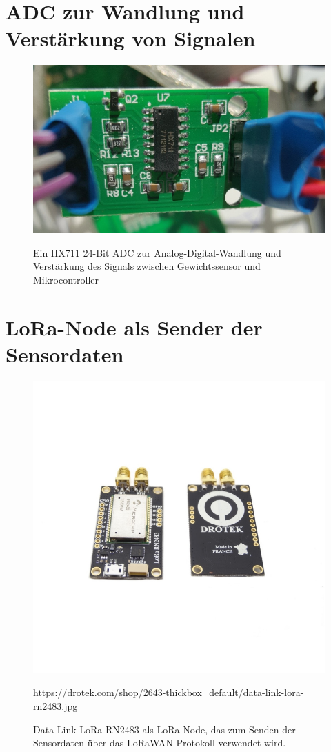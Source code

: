 \section{ADC zur Wandlung und Verstärkung von Signalen}
\begin{figure}[ht]
    \center
    \includegraphics[width=14cm]{Bilder/gewichtssensor.jpg}\\
    \caption{Ein HX711 24-Bit ADC zur Analog-Digital-Wandlung und Verstärkung des Signals zwischen Gewichtssensor und Mikrocontroller}
    \label{fig:Gewichtssensor}
\end{figure}
\newpage
\section{LoRa-Node als Sender der Sensordaten}
\begin{figure}[ht]
    \center
    \includegraphics[width=14cm]{Bilder/lora-node.jpg}\\
    \caption{Data Link LoRa RN2483 als LoRa-Node, das zum Senden der Sensordaten über das LoRaWAN-Protokoll verwendet wird.}
    \begin{flushleft}
        \quelle\url{https://drotek.com/shop/2643-thickbox_default/data-link-lora-rn2483.jpg}
    \end{flushleft}
    \label{fig:Lora-Node}
\end{figure}


